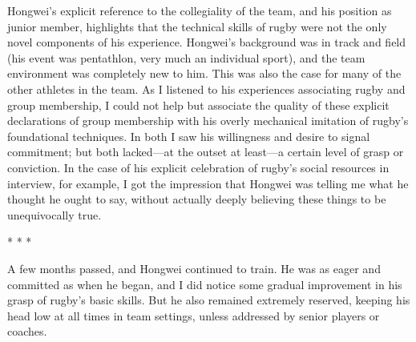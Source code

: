 \begin{CJK}{UTF8}{gbsn}
Hongwei's explicit reference to the collegiality of the team, and his position as junior member, highlights that the technical skills of rugby were not the only novel components of his experience.  Hongwei's background was in track and field (his event was pentathlon, very much an individual sport), and the team environment was completely new to him.  This was also the case for many of the other athletes in the team.  As I listened to his experiences associating rugby and group membership, I could not help but associate the quality of these explicit declarations of group membership with his overly mechanical imitation of rugby's foundational techniques.  In both I saw his willingness and desire to signal commitment; but both lacked---at the outset at least---a certain level of grasp or conviction.  In the case of his explicit celebration of rugby's social resources in interview, for example, I got the impression that Hongwei was telling me what he thought he ought to say, without actually deeply believing these things to be unequivocally true.


                            \begin{center}
                              * * *
                            \end{center}

A few months passed, and Hongwei continued to train.  He was as eager and committed as when he began, and I did notice some gradual improvement in his grasp of rugby's basic skills.  But he also remained extremely reserved, keeping his head low at all times in team settings, unless addressed by senior players or coaches.


\end{CJK}
